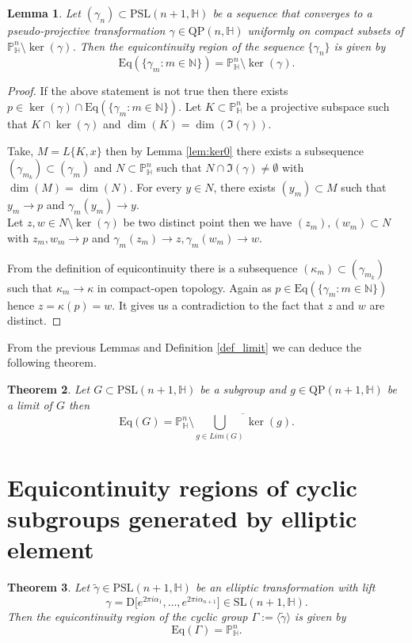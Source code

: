 \documentclass[12pt,reqno]{amsart}
\numberwithin{equation}{section}
\newtheorem{theorem}{Theorem}[section]
\newtheorem{lemma}[theorem]{Lemma}
\theoremstyle{definition}
\def\H{\mathbb H}
\def\P{\mathbb P}
\def\H{\mathbb {H}}
\begin{document}
   \begin{lemma}
\label{lemma:ker}
Let $(\gamma_n) \subset \mathrm{PSL}(n+1, \mathbb{H})$ be a sequence that converges to a pseudo-projective transformation $\gamma \in \mathrm{QP}(n, \mathbb{H})$ uniformly on compact subsets of $\mathbb{P}^n_{\mathbb{H}} \setminus \ker(\gamma)$. Then the equicontinuity region of the sequence $\{\gamma_n\}$ is given by
\[
\mathrm{Eq}(\{\gamma_m : m \in \mathbb{N}\}) = \mathbb{P}^n_{\mathbb{H}} \setminus \ker(\gamma).
\]
\end{lemma}
\begin{proof} If the above statement is not true then there exists $p\in \ker(\gamma)\cap \mathrm{Eq}(\{\gamma_m : m \in \mathbb{N}\})$. Let $K\subset \mathbb{P}^n_{\mathbb{H}}$ be a projective subspace such that $K\cap \ker(\gamma)$ and $\dim (K)=\dim (\Im(\gamma))$.
	\par Take, $M=L\{K,x\}$ then by Lemma \ref{lem:ker0} there exists a subsequence $(\gamma_{m_k})\subset (\gamma_m)$ and $N\subset \mathbb{P}^n_{\mathbb{H}}$ such that $N\cap \Im(\gamma)\neq \emptyset$ with $\dim(M)=\dim(N)$. For every $y\in N$, there exists $(y_m)\subset  M$ such that $y_m\rightarrow p$ and $ \gamma_m(y_m)\rightarrow y$.\\
	 Let $z,w\in N\setminus \ker(\gamma)$ be two distinct point then we have $(z_m),(w_m)\subset N$ with $z_m,w_m\rightarrow p$ and $\gamma_m(z_m)\rightarrow z, \gamma_m(w_m)\rightarrow w$.
	\par From the definition of equicontinuity there is a subsequence $(\kappa_m)\subset (\gamma_{m_k})$ such that $\kappa_m\rightarrow \kappa$ in compact-open topology. Again as $p\in \mathrm{Eq}(\{\gamma_m : m \in \mathbb{N}\})$ hence $z=\kappa(p)=w$. It gives us a contradiction to the fact that $z$ and $w$ are distinct.
\end{proof}

 

   From the previous Lemmas and Definition \ref{def_limit} we can deduce the following theorem.
   \begin{theorem}\label{Th:ker}
      Let $G\subset \mathrm{PSL}(n+1,\H)$ be a subgroup and $g\in \mathrm{QP}(n+1,\H)$ be a limit of $G$ then 
      \begin{equation*}
          \mathrm{Eq}(G)=\P^n_\H \setminus \overline{\bigcup_{g\in Lim(G)}\ker(g)}.
      \end{equation*}
   \end{theorem}
   \section{Equicontinuity regions of cyclic subgroups generated by elliptic element} \label{sec:elliptic}
\begin{theorem}
\label{th:elliptic}
Let $\tilde{\gamma} \in \mathrm{PSL}(n+1, \mathbb{H})$ be an elliptic transformation with lift 
\[
\gamma = \mathrm{D}\big[e^{2\pi i \alpha_1}, \ldots, e^{2\pi i \alpha_{n+1}}\big] \in \mathrm{SL}(n+1, \mathbb{H}).
\]
Then the equicontinuity region of the cyclic group $\Gamma := \langle \tilde{\gamma} \rangle$ is given by
\[
\mathrm{Eq}(\Gamma) = \mathbb{P}^n_{\mathbb{H}}.
\]
\end{theorem}
\end{document}

